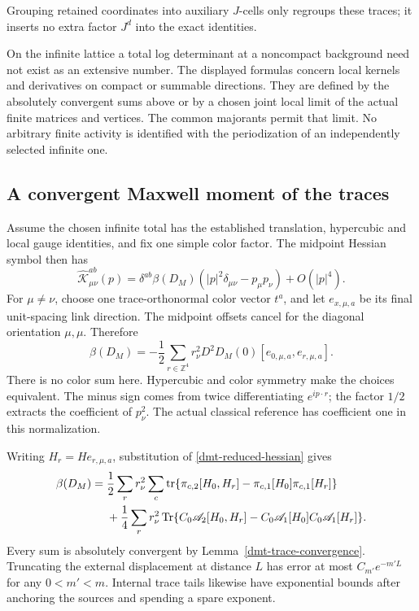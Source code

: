 Grouping retained coordinates into auxiliary \(J\)-cells
only regroups these traces; it inserts no extra factor
\(J^d\) into the exact identities.

On the infinite lattice a total log determinant at a
noncompact background need not exist as an extensive
number. The displayed formulas concern local kernels
and derivatives on compact or summable directions.
They are defined by the absolutely convergent sums above
or by a chosen joint local limit of the actual finite
matrices and vertices. The common majorants permit that
limit. No arbitrary finite activity is identified with
the periodization of an independently selected infinite
one.

\subsection{A convergent Maxwell moment of the traces}
\label{dmt-Maxwell-section}

Assume the chosen infinite total has the established
translation, hypercubic and local gauge identities, and
fix one simple color factor. The midpoint Hessian symbol
then has
\begin{equation}
 \widehat{\mathcal K}_{\mu\nu}^{ab}(p)
 =\delta^{ab}\beta(D_M)
       (|p|^2\delta_{\mu\nu}-p_\mu p_\nu)+O(|p|^4).
 \label{dmt-Maxwell-symbol}
\end{equation}
For \(\mu\ne\nu\), choose one trace-orthonormal color
vector \(t^a\), and let \(e_{x,\mu,a}\) be its final
unit-spacing link direction. The midpoint offsets
cancel for the diagonal orientation \(\mu,\mu\).
Therefore
\begin{equation}
 \boxed{\displaystyle
 \beta(D_M)=-\frac12\sum_{r\in\mathbb Z^4}r_\nu^2
       D^2D_M(0)[e_{0,\mu,a},e_{r,\mu,a}].}
 \label{dmt-Maxwell-moment}
\end{equation}
There is no color sum here. Hypercubic and color symmetry
make the choices equivalent. The minus sign comes from
twice differentiating \(e^{ip\cdot r}\); the factor
\(1/2\) extracts the coefficient of \(p_\nu^2\).
The actual classical reference has coefficient one in
this normalization.

Writing \(H_r=H e_{r,\mu,a}\), substitution of
\eqref{dmt-reduced-hessian} gives
\begin{align}
 \beta(D_M)
 ={}&\frac12\sum_r r_\nu^2\sum_c\operatorname{tr}
 \{\pi_{c,2}[H_0,H_r]
       -\pi_{c,1}[H_0]\pi_{c,1}[H_r]\}\notag\\
 &+\frac14\sum_r r_\nu^2\operatorname{Tr}
 \{C_0\mathscr A_2[H_0,H_r]
       -C_0\mathscr A_1[H_0]C_0\mathscr A_1[H_r]\}.
 \label{dmt-explicit-Maxwell-trace}
\end{align}
Every sum is absolutely convergent by
Lemma~\ref{dmt-trace-convergence}. Truncating the external
displacement at distance \(L\) has error at most
\(C_{m'}e^{-m'L}\) for any \(0<m'<m\).
Internal trace tails likewise have exponential bounds
after anchoring the sources and spending a spare exponent.

